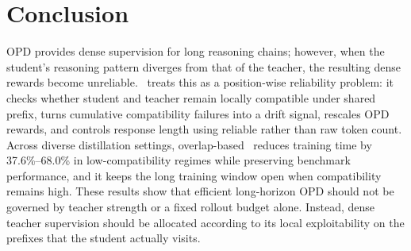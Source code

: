 \section{Conclusion}
\vspace{-3mm}
OPD provides dense supervision for long reasoning chains; however, when the student's reasoning pattern diverges from that of the teacher, the resulting dense rewards become unreliable.
\method~treats this as a position-wise reliability problem: it checks whether student and teacher remain locally compatible under shared prefix, turns cumulative compatibility failures into a drift signal, rescales OPD rewards, and controls response length using reliable rather than raw token count.
Across diverse distillation settings, overlap-based \method~reduces training time by 37.6\%--68.0\% in low-compatibility regimes while preserving benchmark performance, and it keeps the long training window open when compatibility remains high.
These results show that efficient long-horizon OPD should not be governed by teacher strength or a fixed rollout budget alone.
Instead, dense teacher supervision should be allocated according to its local exploitability on the prefixes that the student actually visits.
